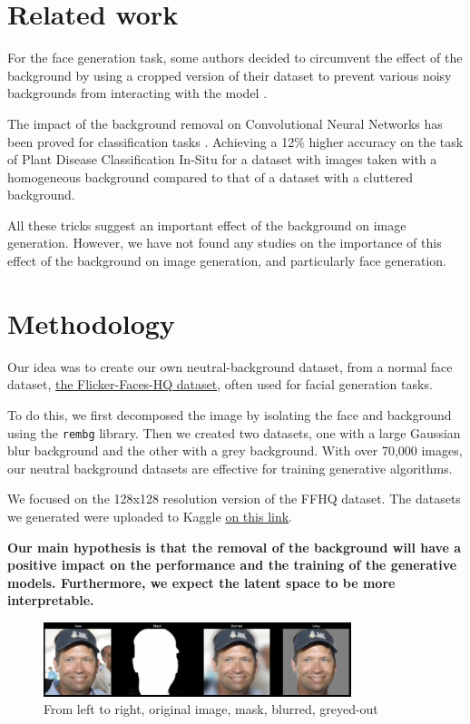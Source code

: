 \documentclass{article}
\begin{document}
\section{Related work}

\quad For the face generation task, some authors decided to circumvent the effect of the background by using a cropped version of their dataset to prevent various noisy backgrounds from interacting with the model \cite{gauthier2014conditional}. 

The impact of the background removal on Convolutional Neural Networks has been proved for classification tasks \cite{kcyin2021impact}. Achieving a 12\% higher accuracy on the task of Plant Disease Classification In-Situ for a dataset with images taken with a homogeneous background compared to that of a dataset with a cluttered background.

All these tricks suggest an important effect of the background on image generation. 
However, we have not found any studies on the importance of this effect of the background on image generation, and particularly face generation.

\section{Methodology}

\quad Our idea was to create our own neutral-background dataset, from a normal face dataset, \hyperlink{https://github.com/NVlabs/ffhq-dataset}{the Flicker-Faces-HQ dataset}, often used for facial generation tasks. 

To do this, we first decomposed the image by isolating the face and background using the \texttt{rembg} library. 
Then we created two datasets, one with a large Gaussian blur background and the other with a grey background. 
With over 70,000 images, our neutral background datasets are effective for training generative algorithms.

We focused on the 128x128 resolution version of the FFHQ dataset.
The datasets we generated were uploaded to Kaggle \hyperlink{https://www.kaggle.com/thomaskientz/datasets}{on this link}.

\textbf{Our main hypothesis is that the removal of the background will have a positive impact on the performance and the training of the generative models. 
Furthermore, we expect the latent space to be more interpretable.}

\begin{figure}[H]
    \centering
    \includegraphics[width=0.8\textwidth]{images/mask.png}
    \caption{From left to right, original image, mask, blurred, greyed-out}
\end{figure}
\end{document}
